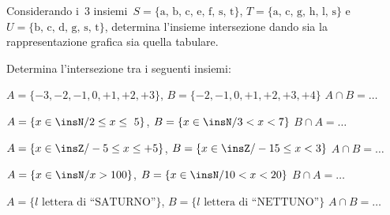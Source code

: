 % 
% 
% 

\begin{esercizio}
 \label{ese:7.12}
Considerando i~3 insiemi~$S=\{\text{a, b, c, e, f, s, t}\}$, $T=\{\text{a, c, g, 
h, l, s}\}$ e~$U=\{\text{b, c, d, g, s, t}\}$,
determina l'insieme intersezione dando sia la rappresentazione grafica sia 
quella tabulare.
 \end{esercizio}

\begin{esercizio}
 \label{ese:7.13}
 Determina l'intersezione tra i seguenti insiemi:
\begin{enumeratea}
 \item $A=\{-3, -2, -1, 0, +1, +2, +3\}$, $B=\{-2,-1, 0, +1, +2, +3, +4\}$ 
$A\cap B=\ldots$
 \item $A=\{x\in\insN/2\le x\le~5\}$, $B=\{x\in\insN/3<x<7\}$ $B\cap A=\ldots$
 \item $A=\{x\in\insZ/-5\le x\le+5\}$, $B=\{x\in\insZ/-15\le x<3\}$ $A\cap 
B=\ldots$
 \item $A=\{x\in\insN/x>100\}$, $B=\{x\in\insN/10<x<20\}$ $B\cap A=\ldots$
 \item $A=\{l\text{ lettera di ``SATURNO''}\}$, $B=\{l\text{ lettera di 
``NETTUNO''}\}$ $A\cap B=\ldots$
\end{enumeratea}
\end{esercizio}

